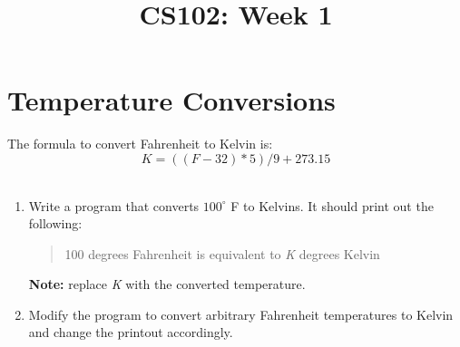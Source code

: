 \documentclass{article}
\begin{document}
\title{CS102: Week 1}

\maketitle

\section*{Temperature Conversions}
The formula to convert Fahrenheit to Kelvin is:	
\begin{equation}	
	K = ((F-32)*5)/9 + 273.15
\end{equation}
\\
\begin{enumerate}
\item Write a program that converts $100^{\circ}$ F to Kelvins. It should print out the following:
	\begin{quote}
	100 degrees Fahrenheit is equivalent to \textit{K} degrees Kelvin
	\end{quote}
	\textbf{Note:} replace \textit{K} with the converted temperature. 
\item Modify the program to convert arbitrary Fahrenheit temperatures to Kelvin and change the printout accordingly.
\end{enumerate}
\end{document}
